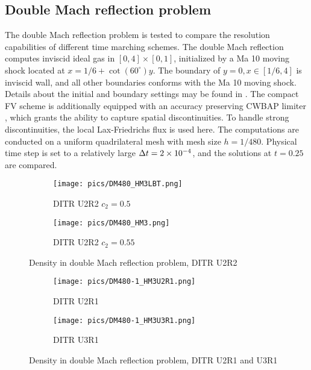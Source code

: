 \subsection{Double Mach reflection problem}

The double Mach reflection problem \cite{woodward1984dmr} is tested to
compare the resolution capabilities
of different time marching schemes.
The double Mach reflection computes
inviscid ideal gas in $[0,4]\times[0,1]$,
initialized by a Ma 10 moving shock located
at $x = 1/6 + \cot(60^\circ) y$.
The boundary of $y=0, x\in[1/6,4]$ is
inviscid wall, and all other boundaries
conforms with the Ma 10 moving shock.
Details about the initial and boundary settings may be found in \cite{woodward1984dmr}.
The compact FV scheme is additionally equipped with
an accuracy preserving CWBAP limiter \cite{wu2023cwbap},
which grants the ability to capture spatial  discontinuities.
To handle strong discontinuities, the local Lax-Friedrichs flux
is used here.
The computations are conducted on a uniform quadrilateral mesh with
mesh size $h=1/480$.
Physical time step is set to a relatively large ${\Delta} t= 2\times10^{-4}$,
and the solutions at $t=0.25$ are compared.

\begin{figure}[htbp]
    \centering
    \begin{subfigure}{0.5\textwidth}
        \texttt{[image: pics/DM480\_HM3LBT.png]}
        \caption[]{DITR U2R2 $c_2=0.5$}
        \label{sfig:DM480_HM3LBT}
    \end{subfigure}\hfill
    \begin{subfigure}{0.5\textwidth}
        \texttt{[image: pics/DM480\_HM3.png]}
        \caption[]{DITR U2R2 $c_2=0.55$}
        \label{sfig:DM480_HM3}
    \end{subfigure}
    \caption{Density in double Mach reflection problem, DITR U2R2}
    \label{fig:DM480-1}
\end{figure}

\begin{figure}[htbp]
    \centering
    \begin{subfigure}{0.5\textwidth}
        \texttt{[image: pics/DM480-1\_HM3U2R1.png]}
        \caption[]{DITR U2R1}
        \label{sfig:DM480_HM3U2R1}
    \end{subfigure}\hfill
    \begin{subfigure}{0.5\textwidth}
        \texttt{[image: pics/DM480-1\_HM3U3R1.png]}
        \caption[]{DITR U3R1}
        \label{sfig:DM480_HM3U3R1}
    \end{subfigure}
    \caption{Density in double Mach reflection problem, DITR U2R1 and U3R1}
    \label{fig:DM480-2}
\end{figure}

